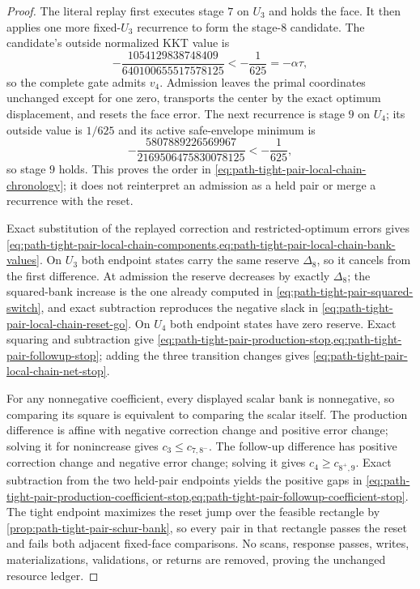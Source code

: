 \begin{proof}
The literal replay first executes stage $7$ on $U_3$ and holds the face.  It
then applies one more fixed-$U_3$ recurrence to form the stage-$8$ candidate.
The candidate's outside normalized KKT value is
\begin{equation*}
 -\frac{1054129838748409}{640100655517578125}
 <-\frac1{625}=-\alpha\tau,
\end{equation*}
so the complete gate admits $v_4$.  Admission leaves the primal coordinates
unchanged except for one zero, transports the center by the exact optimum
displacement, and resets the face error.  The next recurrence is stage $9$ on
$U_4$; its outside value is $1/625$ and its active safe-envelope minimum is
\begin{equation*}
 -\frac{5807889226569967}{2169506475830078125}<-\frac1{625},
\end{equation*}
so stage $9$ holds.  This proves the order in
\cref{eq:path-tight-pair-local-chain-chronology}; it does not reinterpret an
admission as a held pair or merge a recurrence with the reset.

Exact substitution of the replayed correction and restricted-optimum errors
gives
\cref{eq:path-tight-pair-local-chain-components,eq:path-tight-pair-local-chain-bank-values}.
On $U_3$ both endpoint states carry the same reserve $\Delta_8$, so it cancels
from the first difference.  At admission the reserve decreases by exactly
$\Delta_8$; the squared-bank increase is the one already computed in
\cref{eq:path-tight-pair-squared-switch}, and exact subtraction reproduces the
negative slack in
\cref{eq:path-tight-pair-local-chain-reset-go}.  On $U_4$ both endpoint states
have zero reserve.  Exact squaring and subtraction give
\cref{eq:path-tight-pair-production-stop,eq:path-tight-pair-followup-stop};
adding the three transition changes gives
\cref{eq:path-tight-pair-local-chain-net-stop}.

For any nonnegative coefficient, every displayed scalar bank is nonnegative,
so comparing its square is equivalent to comparing the scalar itself.  The
production difference is affine with negative correction change and positive
error change; solving it for nonincrease gives
$c_3\leq c_{7,8^-}$.  The follow-up difference has positive correction change
and negative error change; solving it gives $c_4\geq c_{8^+,9}$.  Exact
subtraction from the two held-pair endpoints yields the positive gaps in
\cref{eq:path-tight-pair-production-coefficient-stop,eq:path-tight-pair-followup-coefficient-stop}.
The tight endpoint maximizes the reset jump over the feasible rectangle by
\cref{prop:path-tight-pair-schur-bank}, so every pair in that rectangle passes
the reset and fails both adjacent fixed-face comparisons.  No scans, response
passes, writes, materializations, validations, or returns are removed, proving
the unchanged resource ledger.
\end{proof}

